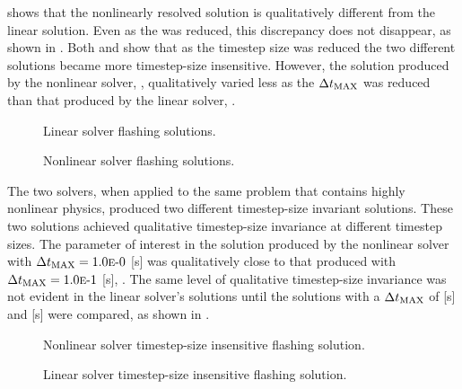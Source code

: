  shows that the nonlinearly resolved solution is qualitatively different from the linear solution.
Even as the \dtmax{} was reduced, this discrepancy does not disappear, as shown in .
Both  and  show that as the timestep size was reduced the two different solutions became more timestep-size insensitive.
However, the solution produced by the nonlinear solver, , qualitatively varied less as the $\dtmax{}$ was reduced than that produced by the linear solver, .

\begin{figure}[h!tb]
\centering

\caption{Linear solver flashing solutions.}
\label{fig:flashingAlphaLin}
\end{figure}

\begin{figure}[h!tb]
\centering

\caption{Nonlinear solver flashing solutions.}
\label{fig:flashingAlphaNln}
\end{figure}

The two solvers, when applied to the same problem that contains highly nonlinear physics, produced two different timestep-size invariant solutions.
These two solutions achieved qualitative timestep-size invariance at different timestep sizes.
The parameter of interest in the solution produced by the nonlinear solver with $\dtmax{} = \expneg{1.0}{0}$ [s] was qualitatively close to that produced with $\dtmax{} = \expneg{1.0}{1}$ [s], .
The same level of qualitative timestep-size invariance was not evident in the linear solver's solutions until the solutions with a $\dtmax{}$ of  [s] and  [s] were compared, as shown in .

\begin{figure}[h!tb]
\centering

\caption{Nonlinear solver timestep-size insensitive flashing solution.}
\label{fig:flashingDtInsensitiveNln}
\end{figure}

\begin{figure}[h!tb]
\centering

\caption{Linear solver timestep-size insensitive flashing solution.}
\label{fig:flashingDtInsensitiveLin}
\end{figure}

